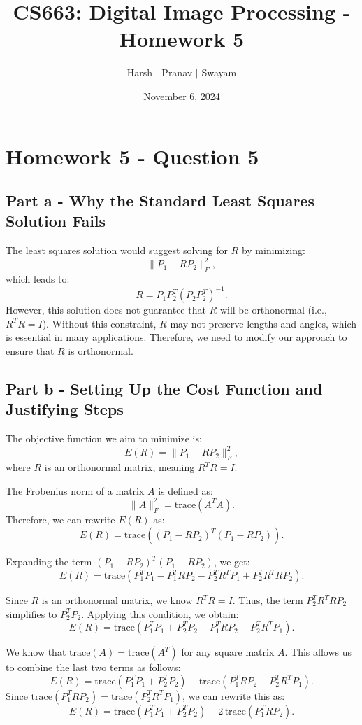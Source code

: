 \documentclass{article}
\title{CS663: Digital Image Processing - Homework 5}
\author{Harsh $\vert$ Pranav $\vert$ Swayam}
\date{November 6, 2024}
\begin{document}
\maketitle
\flushleft
\section*{Homework 5 - Question 5}

\subsection*{Part a - Why the Standard Least Squares Solution Fails}

The least squares solution would suggest solving for \( R \) by minimizing:
\[
\| P_1 - R P_2 \|_F^2,
\]
which leads to:
\[
R = P_1 P_2^T (P_2 P_2^T)^{-1}.
\]
However, this solution does not guarantee that \( R \) will be orthonormal (i.e., \( R^T R = I \)). Without this constraint, \( R \) may not preserve lengths and angles, which is essential in many applications. Therefore, we need to modify our approach to ensure that \( R \) is orthonormal.


\subsection*{Part b - Setting Up the Cost Function and Justifying Steps}

The objective function we aim to minimize is:
\[
E(R) = \| P_1 - R P_2 \|_F^2,
\]
where \( R \) is an orthonormal matrix, meaning \( R^T R = I \).

The Frobenius norm of a matrix \( A \) is defined as:
\[
\| A \|_F^2 = \text{trace}(A^T A).
\]
Therefore, we can rewrite \( E(R) \) as:
\[
E(R) = \text{trace}((P_1 - R P_2)^T (P_1 - R P_2)).
\]

Expanding the term \((P_1 - R P_2)^T (P_1 - R P_2)\), we get:
\[
E(R) = \text{trace}(P_1^T P_1 - P_1^T R P_2 - P_2^T R^T P_1 + P_2^T R^T R P_2).
\]

Since \( R \) is an orthonormal matrix, we know \( R^T R = I \). Thus, the term \( P_2^T R^T R P_2 \) simplifies to \( P_2^T P_2 \). Applying this condition, we obtain:
\[
E(R) = \text{trace}(P_1^T P_1 + P_2^T P_2 - P_1^T R P_2 - P_2^T R^T P_1).
\]

We know that \( \text{trace}(A) = \text{trace}(A^T) \) for any square matrix \( A \). This allows us to combine the last two terms as follows:
\[
E(R) = \text{trace}(P_1^T P_1 + P_2^T P_2) - \text{trace}(P_1^T R P_2 + P_2^T R^T P_1).
\]
Since \( \text{trace}(P_1^T R P_2) = \text{trace}(P_2^T R^T P_1) \), we can rewrite this as:
\[
E(R) = \text{trace}(P_1^T P_1 + P_2^T P_2) - 2 \, \text{trace}(P_1^T R P_2).
\]
\end{document}
